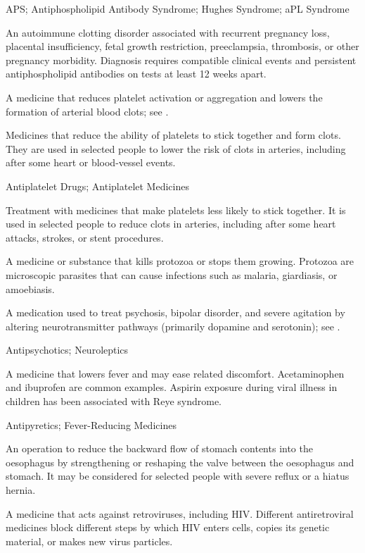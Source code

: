 \synonyms
APS; Antiphospholipid Antibody Syndrome; Hughes Syndrome; aPL Syndrome

 An autoimmune clotting disorder
associated with recurrent pregnancy loss, placental insufficiency, fetal growth restriction,
preeclampsia, thrombosis, or other pregnancy morbidity. Diagnosis requires compatible
clinical events and persistent antiphospholipid antibodies on tests at least 12 weeks apart.

 A medicine that reduces platelet activation or aggregation and lowers the formation of arterial blood clots; see .

 Medicines that reduce the ability of platelets to stick together and form clots. They are used in selected people to lower the risk of clots in arteries, including after some heart or blood-vessel events.

\synonyms
Antiplatelet Drugs; Antiplatelet Medicines

 Treatment with medicines that make platelets less likely to stick together. It is used in selected people to reduce clots in arteries, including after some heart attacks, strokes, or stent procedures.

 A medicine or substance that kills protozoa or stops them growing. Protozoa are microscopic parasites that can cause infections such as malaria, giardiasis, or amoebiasis.

 A medication used to treat psychosis, bipolar disorder, and severe agitation by altering neurotransmitter pathways (primarily dopamine and serotonin); see .

\synonyms
Antipsychotics; Neuroleptics

 A medicine that lowers fever and may ease related
discomfort. Acetaminophen and ibuprofen are common examples. Aspirin exposure
during viral illness in children has been associated with Reye syndrome.

\synonyms
Antipyretics; Fever-Reducing Medicines

 An operation to reduce the backward flow of stomach contents into the oesophagus by strengthening or reshaping the valve between the oesophagus and stomach. It may be considered for selected people with severe reflux or a hiatus hernia.

 A medicine that acts against retroviruses, including HIV. Different antiretroviral medicines block different steps by which HIV enters cells, copies its genetic material, or makes new virus particles.

